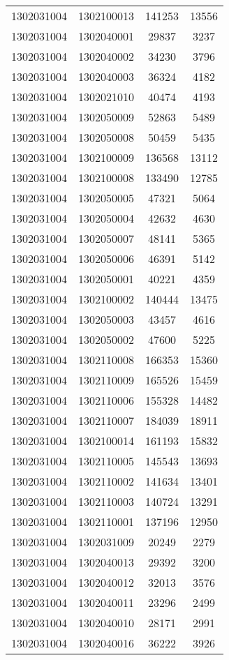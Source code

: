 \begin{longtable}{llcc}
1302031004 & 1302100013 & 141253 & 13556\\
1302031004 & 1302040001 & 29837 & 3237\\
1302031004 & 1302040002 & 34230 & 3796\\
1302031004 & 1302040003 & 36324 & 4182\\
1302031004 & 1302021010 & 40474 & 4193\\
1302031004 & 1302050009 & 52863 & 5489\\
1302031004 & 1302050008 & 50459 & 5435\\
1302031004 & 1302100009 & 136568 & 13112\\
1302031004 & 1302100008 & 133490 & 12785\\
1302031004 & 1302050005 & 47321 & 5064\\
1302031004 & 1302050004 & 42632 & 4630\\
1302031004 & 1302050007 & 48141 & 5365\\
1302031004 & 1302050006 & 46391 & 5142\\
1302031004 & 1302050001 & 40221 & 4359\\
1302031004 & 1302100002 & 140444 & 13475\\
1302031004 & 1302050003 & 43457 & 4616\\
1302031004 & 1302050002 & 47600 & 5225\\
1302031004 & 1302110008 & 166353 & 15360\\
1302031004 & 1302110009 & 165526 & 15459\\
1302031004 & 1302110006 & 155328 & 14482\\
1302031004 & 1302110007 & 184039 & 18911\\
1302031004 & 1302100014 & 161193 & 15832\\
1302031004 & 1302110005 & 145543 & 13693\\
1302031004 & 1302110002 & 141634 & 13401\\
1302031004 & 1302110003 & 140724 & 13291\\
1302031004 & 1302110001 & 137196 & 12950\\
1302031004 & 1302031009 & 20249 & 2279\\
1302031004 & 1302040013 & 29392 & 3200\\
1302031004 & 1302040012 & 32013 & 3576\\
1302031004 & 1302040011 & 23296 & 2499\\
1302031004 & 1302040010 & 28171 & 2991\\
1302031004 & 1302040016 & 36222 & 3926\\

\end{longtable}

